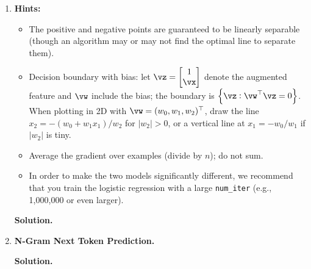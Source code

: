 \documentclass{article}
\theoremstyle{definition}
\theoremstyle{remark}
\newenvironment{Q}
{%
  \clearpage
  \item
  }
  {%
    \phantom{s} %
    \bigskip
    \textbf{Solution.}
  }
\begin{document}
\begin{enumerate}[font={\Large\bfseries},left=0pt]
\begin{Q}
\begin{enumerate}
  \textbf{Hints:}
  \begin{itemize}
      \item The positive and negative points are guaranteed to be linearly separable (though an algorithm may or may not find the optimal line to separate them).
      \item Decision boundary with bias: let $\vz = \begin{bmatrix}1 \\ \vx\end{bmatrix}$ denote the augmented feature and $\vw$ include the bias; the boundary is $\cbr{\vz : \vw^\top \vz = 0}$. When plotting in 2D with $\vw = (w_0, w_1, w_2)^\top$, draw the line $x_2 = -(w_0 + w_1 x_1)/w_2$ for $|w_2|>0$, or a vertical line at $x_1 = -w_0/w_1$ if $|w_2|$ is tiny.
      \item Average the gradient over examples (divide by $n$); do not sum.
      \item In order to make the two models significantly different, we recommend that you train the logistic regression with a large \texttt{num\_iter} (e.g., 1,000,000 or even larger).
  \end{itemize}
  \end{enumerate}
  \end{Q}

  \begin{Q}
    \textbf{\Large N-Gram Next Token Prediction.}
  

\end{Q}
\end{enumerate}
\end{document}
